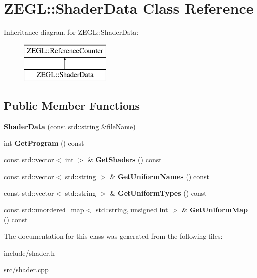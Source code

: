 \hypertarget{class_z_e_g_l_1_1_shader_data}{}\section{Z\+E\+G\+L\+:\+:Shader\+Data Class Reference}
\label{class_z_e_g_l_1_1_shader_data}
Inheritance diagram for Z\+E\+G\+L\+:\+:Shader\+Data\+:\begin{figure}[H]
\begin{center}
\leavevmode
\includegraphics[height=2.000000cm]{class_z_e_g_l_1_1_shader_data}
\end{center}
\end{figure}
\subsection*{Public Member Functions}
\begin{DoxyCompactItemize}
\item 
\hypertarget{class_z_e_g_l_1_1_shader_data_a635def1584d9fbf143b1ee5941a72cf0}{}{\bfseries Shader\+Data} (const std\+::string \&file\+Name)\label{class_z_e_g_l_1_1_shader_data_a635def1584d9fbf143b1ee5941a72cf0}

\item 
\hypertarget{class_z_e_g_l_1_1_shader_data_a6c5b057d29058853bf6c4a5096f2e823}{}int {\bfseries Get\+Program} () const \label{class_z_e_g_l_1_1_shader_data_a6c5b057d29058853bf6c4a5096f2e823}

\item 
\hypertarget{class_z_e_g_l_1_1_shader_data_ac20702e6e6be0026da6b176f50c09e0c}{}const std\+::vector$<$ int $>$ \& {\bfseries Get\+Shaders} () const \label{class_z_e_g_l_1_1_shader_data_ac20702e6e6be0026da6b176f50c09e0c}

\item 
\hypertarget{class_z_e_g_l_1_1_shader_data_adc2751fc43f8f3d57051f63d5c49737d}{}const std\+::vector$<$ std\+::string $>$ \& {\bfseries Get\+Uniform\+Names} () const \label{class_z_e_g_l_1_1_shader_data_adc2751fc43f8f3d57051f63d5c49737d}

\item 
\hypertarget{class_z_e_g_l_1_1_shader_data_ac6574aa6f23427cb7e307353d1495abb}{}const std\+::vector$<$ std\+::string $>$ \& {\bfseries Get\+Uniform\+Types} () const \label{class_z_e_g_l_1_1_shader_data_ac6574aa6f23427cb7e307353d1495abb}

\item 
\hypertarget{class_z_e_g_l_1_1_shader_data_a4e4939d56d7c9c0e749c2d7f1dedfd13}{}const std\+::unordered\+\_\+map$<$ std\+::string, unsigned int $>$ \& {\bfseries Get\+Uniform\+Map} () const \label{class_z_e_g_l_1_1_shader_data_a4e4939d56d7c9c0e749c2d7f1dedfd13}

\end{DoxyCompactItemize}


The documentation for this class was generated from the following files\+:\begin{DoxyCompactItemize}
\item 
include/shader.\+h\item 
src/shader.\+cpp\end{DoxyCompactItemize}
